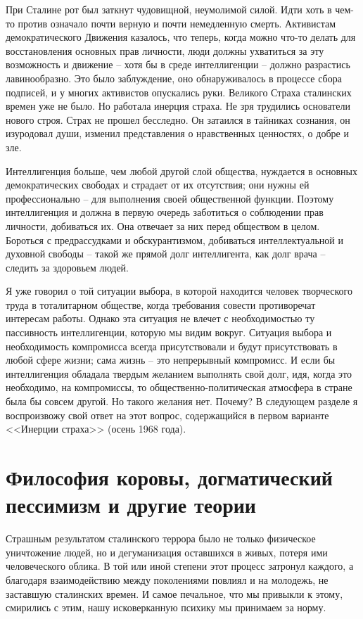 \documentclass{book}
\begin{document}
При Сталине рот был заткнут чудовищной, неумолимой силой. Идти хоть в чем-то против означало почти верную и почти немедленную смерть. Активистам демократического Движения казалось, что теперь, когда можно что-то делать для восстановления основных прав личности, люди должны ухватиться за эту возможность и движение -- хотя бы в среде интеллигенции -- должно разрастись лавинообразно. Это было заблуждение, оно обнаруживалось в процессе сбора под­писей, и у многих активистов опускались руки. Великого Стра­ха сталинских времен уже не было. Но работала инерция стра­ха. Не зря трудились основатели нового строя. Страх не про­шел бесследно. Он затаился в тайниках сознания, он изуродовал души, изменил представления о нравственных ценностях, о добре и зле.

Интеллигенция больше, чем любой другой слой общества, нуждается в основных демократических свободах и страдает от их отсутствия; они нужны ей профессионально -- для выполнения своей общественной функции. Поэтому интеллигенция и должна в первую очередь заботиться о соблюдении прав личности, добиваться их. Она отвечает за них перед обществом в целом. Бороться с предрассудками и обскурантизмом, добиваться интеллектуальной и духовной свободы -- такой же прямой долг интеллигента, как долг врача -- следить за здоровьем людей.

Я уже говорил о той ситуации выбора, в которой находится человек творческого труда в тоталитарном обществе, когда требования совести противоречат интересам работы. Однако эта ситуация не влечет с необходимостью ту пассивность интеллигенции, которую мы видим вокруг. Ситуация выбора и необходимость компромисса всегда присутствовали и будут присутствовать в любой сфере жизни; сама жизнь -- это непрерывный компромисс. И если бы интеллигенция обладала твердым желанием выполнять свой долг, идя, когда это необходимо, на компромиссы, то общественно-политическая атмосфера в стране была бы совсем другой. Но такого желания нет. Почему? В следующем разделе я воспроизвожу свой ответ на этот вопрос, содержащийся в первом варианте <<Инерции страха>> (осень 1968 года).


\section{Философия коровы, догматический пессимизм и другие теории}

Страшным результатом сталинского террора было не только физическое уничтожение людей, но и дегуманизация оставшихся в живых, потеря ими человеческого облика. В той или иной степени этот процесс затронул каждого, а благодаря взаимодействию между поколениями повлиял и на молодежь, не заставшую сталинских времен. И самое печальное, что мы привыкли к этому, смирились с этим, нашу исковерканную психику мы принимаем за норму.
\end{document}
